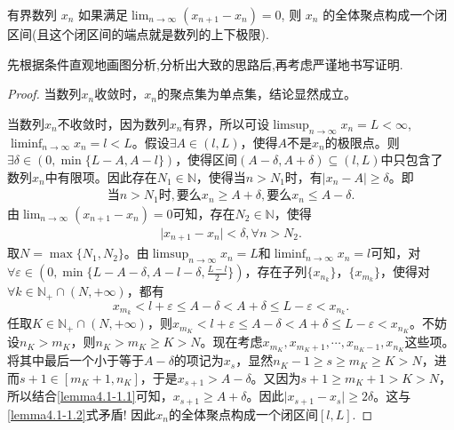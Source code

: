 \documentclass[lang=cn,newtx,10pt,scheme=chinese]{elegantbook}
\begin{document}
\begin{lemma}\label{lemma:有界数列差分极限为0则其闭包一定是闭区间}
有界数列 \( x_n \) 如果满足$\lim_{n \to \infty} (x_{n+1} - x_n) = 0$,
则 \( x_n \) 的全体聚点构成一个闭区间(且这个闭区间的端点就是数列的上下极限).
\end{lemma}
\begin{note}
先根据条件直观地画图分析,分析出大致的思路后,再考虑严谨地书写证明.
\end{note}
\begin{proof}
当数列\(x_n\)收敛时，\(x_n\)的聚点集为单点集，结论显然成立。

当数列\(x_n\)不收敛时，因为数列\(x_n\)有界，所以可设\(\limsup_{n\rightarrow \infty}x_n = L<\infty\),\(\liminf_{n\rightarrow \infty}x_n = l<L\)。假设\(\exists A\in (l,L)\)，使得\(A\)不是\(x_n\)的极限点。则\(\exists \delta \in \left( 0,\min \{ L - A,A - l \} \right)\)，使得区间\((A - \delta,A + \delta)\subseteq (l,L)\)中只包含了数列\(x_n\)中有限项。因此存在\(N_1\in \mathbb{N}\)，使得当\(n > N_1\)时，有\(\vert x_n - A\vert\geqslant \delta\)。即
\begin{align}
\text{当}n>N_1\text{时},\text{要么}x_n\geqslant A+\delta ,\text{要么}x_n\leqslant A-\delta .\label{lemma4.1-1.1}
\end{align}
由\(\lim_{n\rightarrow \infty}(x_{n + 1} - x_n) = 0\)可知，存在\(N_2\in \mathbb{N}\)，使得
\begin{align}
\vert x_{n + 1} - x_n\vert<\delta,\forall n > N_2. \label{lemma4.1-1.2}
\end{align}
取\(N = \max \{ N_1,N_2 \}\)。由\(\limsup_{n\rightarrow \infty}x_n = L\)和\(\liminf_{n\rightarrow \infty}x_n = l\)可知，对\(\forall \varepsilon \in \left( 0,\min \{ L - A - \delta,A - l - \delta,\frac{L - l}{2} \} \right)\)，存在子列\(\{ x_{n_k} \}\)，\(\{ x_{m_k} \}\)，使得对\(\forall k\in \mathbb{N}_+\cap (N,+\infty)\)，都有
\[
x_{m_k}<l + \varepsilon \leqslant A - \delta <A + \delta \leqslant L - \varepsilon <x_{n_k}.
\]
任取\(K\in \mathbb{N}_+\cap (N,+\infty)\)，则\(x_{m_K}<l + \varepsilon \leqslant A - \delta <A + \delta \leqslant L - \varepsilon <x_{n_K}\)。不妨设\(n_K>m_K\)，则\(n_K>m_K\geqslant K>N\)。现在考虑\(x_{m_K},x_{m_K + 1},\cdots,x_{n_K - 1},x_{n_K}\)这些项。将其中最后一个小于等于\(A - \delta\)的项记为\(x_s\)，显然\(n_K - 1\geqslant s\geqslant m_K\geqslant K>N\)，进而\(s + 1\in [m_K + 1,n_K]\)，于是\(x_{s + 1}>A - \delta\)。又因为\(s + 1\geqslant m_K + 1>K>N\)，所以结合\eqref{lemma4.1-1.1}可知，\(x_{s + 1}\geqslant A + \delta\)。因此\(\vert x_{s + 1} - x_s\vert\geqslant 2\delta\)。这与\eqref{lemma4.1-1.2}式矛盾! 因此\(x_n\)的全体聚点构成一个闭区间$[l,L]$.
\end{proof}
\end{document}

